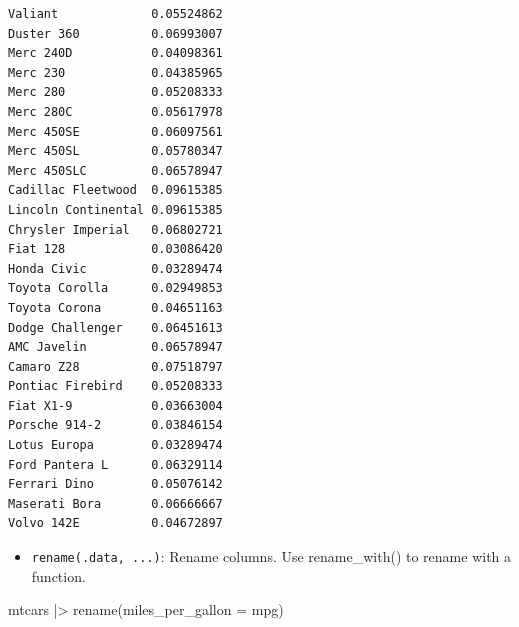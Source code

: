 \documentclass[
  letterpaper,
  DIV=11,
  numbers=noendperiod]{scrreprt}
\newenvironment{Shaded}{\begin{snugshade}}{\end{snugshade}}
\newcommand{\AttributeTok}[1]{\textcolor[rgb]{0.40,0.45,0.13}{#1}}
\newcommand{\FunctionTok}[1]{\textcolor[rgb]{0.28,0.35,0.67}{#1}}
\newcommand{\NormalTok}[1]{\textcolor[rgb]{0.00,0.23,0.31}{#1}}
\newcommand{\SpecialCharTok}[1]{\textcolor[rgb]{0.37,0.37,0.37}{#1}}
\providecommand{\tightlist}{%
  \setlength{\itemsep}{0pt}\setlength{\parskip}{0pt}}\usepackage{longtable,booktabs,array}
\begin{document}
\begin{verbatim}
Valiant             0.05524862
Duster 360          0.06993007
Merc 240D           0.04098361
Merc 230            0.04385965
Merc 280            0.05208333
Merc 280C           0.05617978
Merc 450SE          0.06097561
Merc 450SL          0.05780347
Merc 450SLC         0.06578947
Cadillac Fleetwood  0.09615385
Lincoln Continental 0.09615385
Chrysler Imperial   0.06802721
Fiat 128            0.03086420
Honda Civic         0.03289474
Toyota Corolla      0.02949853
Toyota Corona       0.04651163
Dodge Challenger    0.06451613
AMC Javelin         0.06578947
Camaro Z28          0.07518797
Pontiac Firebird    0.05208333
Fiat X1-9           0.03663004
Porsche 914-2       0.03846154
Lotus Europa        0.03289474
Ford Pantera L      0.06329114
Ferrari Dino        0.05076142
Maserati Bora       0.06666667
Volvo 142E          0.04672897
\end{verbatim}

\begin{itemize}
\tightlist
\item
  \texttt{rename(.data,\ ...)}: Rename columns. Use rename\_with() to
  rename with a function.
\end{itemize}

\begin{Shaded}
\begin{Highlighting}[]
\NormalTok{mtcars }\SpecialCharTok{|\textgreater{}} \FunctionTok{rename}\NormalTok{(}\AttributeTok{miles\_per\_gallon =}\NormalTok{ mpg)}
\end{Highlighting}
\end{Shaded}
\end{document}
